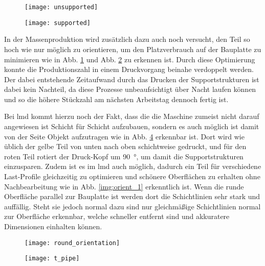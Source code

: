 \documentclass[../main.tex]{subfiles}
\begin{document}
\begin{figure}[h]
	\centering
	\texttt{[image: unsupported]}
	\label{img:unsupp_1}
\end{figure}
\begin{figure}[h]
	\centering
	\texttt{[image: supported]}
	\label{img:supp_1}
\end{figure}
In der Massenproduktion wird zusätzlich dazu auch noch versucht, den Teil so hoch wie nur möglich zu orientieren, um den Platzverbrauch auf der Bauplatte zu minimieren wie in Abb. \ref{img:unsupp_1} und Abb. \ref{img:supp_1} zu erkennen ist. Durch diese Optimierung konnte die Produktionszahl in einem Druckvorgang beinahe verdoppelt werden. Der dabei entstehende Zeitaufwand durch das Drucken der Supportstrukturen ist dabei kein Nachteil, da diese Prozesse unbeaufsichtigt über Nacht laufen können und so die höhere Stückzahl am nächsten Arbeitstag dennoch fertig ist. \cite{lim2015}

Bei \acrfull{lmd} kommt hierzu noch der Fakt, dass die die Maschine zumeist nicht darauf angewiesen ist Schicht für Schicht aufzubauen, sondern es auch möglich ist damit von der Seite Objekt aufzutragen wie in Abb. \ref{img:t_pipe} erkennbar ist. Dort wird wie üblich der gelbe Teil von unten nach oben schichtweise gedruckt, und für den roten Teil rotiert der Druck-Kopf um \qty{90}{\degree}, um damit die Supportstrukturen einzusparen. Zudem ist es im \acrshort{lmd} auch möglich, dadurch ein Teil für verschiedene Last-Profile gleichzeitig zu optimieren und schönere Oberflächen zu erhalten ohne Nachbearbeitung wie in Abb. \ref{img:orient_1} erkenntlich ist. Wenn die runde Oberfläche parallel zur Bauplatte ist werden dort die Schichtlinien sehr stark und auffällig. Steht sie jedoch normal dazu sind nur gleichmäßige Schichtlinien normal zur Oberfläche erkennbar, welche schneller entfernt sind und akkuratere Dimensionen einhalten können.
\begin{figure}[H]
	\centering
	\texttt{[image: round\_orientation]}

	\label{img:round_orient}
\end{figure}
\begin{figure}[h]
	\centering
	\texttt{[image: t\_pipe]}
	\label{img:t_pipe}
\end{figure}
\end{document}
